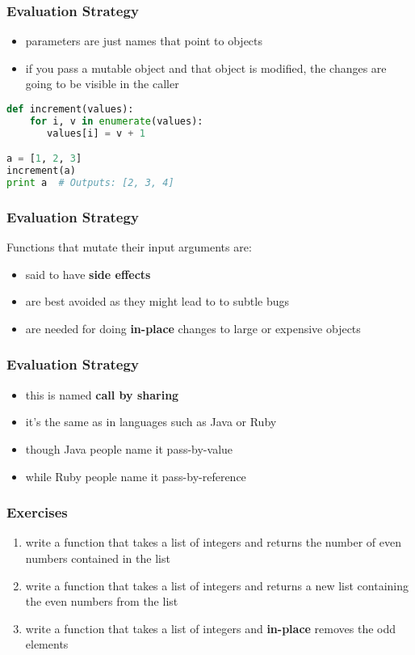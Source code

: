 \documentclass{beamer}
\begin{document}
\begin{frame}[fragile]
\frametitle{Evaluation Strategy}

\begin{itemize}
  \item parameters are just names that point to objects
  \item if you pass a mutable object and that object is modified, the changes are going
    to be visible in the caller
\end{itemize}
\pause
\begin{lstlisting}[language=python]
def increment(values):
    for i, v in enumerate(values):
       values[i] = v + 1

a = [1, 2, 3]
increment(a)
print a  # Outputs: [2, 3, 4]
\end{lstlisting}
\end{frame}

\begin{frame}[fragile]
\frametitle{Evaluation Strategy}

Functions that mutate their input arguments are:

\begin{itemize}
  \item said to have {\bf side effects}
  \item are best avoided as they might lead to to subtle bugs
  \item are needed for doing {\bf in-place} changes to large or expensive objects
\end{itemize}

\end{frame}


\begin{frame}[fragile]
\frametitle{Evaluation Strategy}

\begin{itemize}
  \item this is named {\bf call by sharing}
  \item it's the same as in languages such as Java or Ruby
  \item though Java people name it pass-by-value
  \item while Ruby people name it pass-by-reference
\end{itemize}
\end{frame}


\begin{frame}[fragile]
\frametitle{Exercises}

\begin{enumerate}
  \item write a function that takes a list of integers and returns the number of even numbers contained in the list
  \item write a function that takes a list of integers and returns a new list containing the even numbers from the list
  \item write a function that takes a list of integers and {\bf in-place} removes the odd elements
\end{enumerate}

\end{frame}
\end{document}
